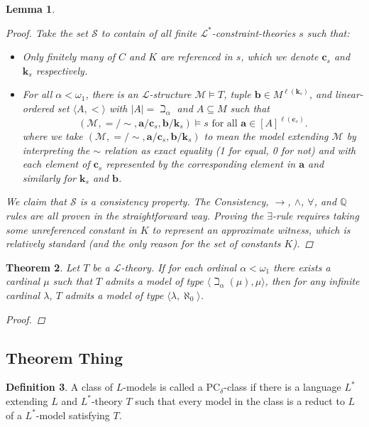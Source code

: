 \documentclass{amsart}
\newtheorem{theorem}{Theorem}[section]
\newtheorem{lemma}[theorem]{Lemma}
\theoremstyle{definition}
\newtheorem{definition}[theorem]{Definition}
\numberwithin{equation}{theorem}
\newcommand{\Q}{\mathbb{Q}}
\newcommand{\V}{\mathbf}
\newcommand{\len}{\ell}
\newcommand{\frag}{\mathcal{L}}
\begin{document}
\begin{lemma}
\begin{proof}
    Take the set $\mathscr{S}$ to contain of all finite $\frag^*$-constraint-theories $s$ such that:
    \begin{itemize}
    \item Only finitely many of $C$ and $K$ are referenced in $s$, which we denote $\V c_s$ and $\V k_s$ respectively.
    \item For all $\alpha<\omega_1$, there is an $\frag$-structure $\mathcal M\models T$, tuple $\V b\in M^{\len(\V k_s)}$, and linear-ordered set $\langle A,<\rangle$ with $|A|=\beth_\alpha$ and $A\subseteq M$ such that 
    \[
      (\mathcal M,{=}/{\sim},\V a/\V c_s, \V b/\V k_s)\models s\text{ for all $\V a\in[A]^{\len(\V c_s)}$}.
    \]
    where we take $(\mathcal M,{=}/{\sim},\V a/\V c_s,\V b/\V k_s)$ to mean the model extending $\mathcal M$ by interpreting the $\sim$ relation as exact equality (1 for equal, 0 for not) and with each element of $\V c_s$ represented by the corresponding element in $\V a$ and similarly for $\V k_s$ and $\V b$.
    \end{itemize}
    We claim that $\mathscr{S}$ is a consistency property.
    The Consistency, $\rightarrow$, $\wedge$, $\forall$, and $\Q$ rules are all proven in the straightforward way.
    Proving the $\exists$-rule requires taking some unreferenced constant in $K$ to represent an approximate witness, which is relatively standard (and the only reason for the set of constants $K$).
    \end{proof}
  \end{lemma}
  \begin{theorem}
    Let $T$ be a $\frag$-theory.
    If for each ordinal $\alpha<\omega_1$ there exists a cardinal $\mu$ such that $T$ admits a model of type $\langle\beth_{\alpha}(\mu),\mu\rangle$, then for any infinite cardinal $\lambda$, $T$ admits a model of type $\langle\lambda,\aleph_0\rangle$.
    \begin{proof}
      
    \end{proof}
  \end{theorem}


\subsection{Theorem Thing}
\newcommand{\PCd}{{$\text{PC}_\delta$}}
  \begin{definition}
    A class of $L$-models is called a \PCd-class if there is a language $L^*$ extending $L$ and $L^*$-theory $T$ such that every model in the class is a reduct to $L$ of a $L^*$-model satisfying $T$.
  \end{definition}
\end{document}
